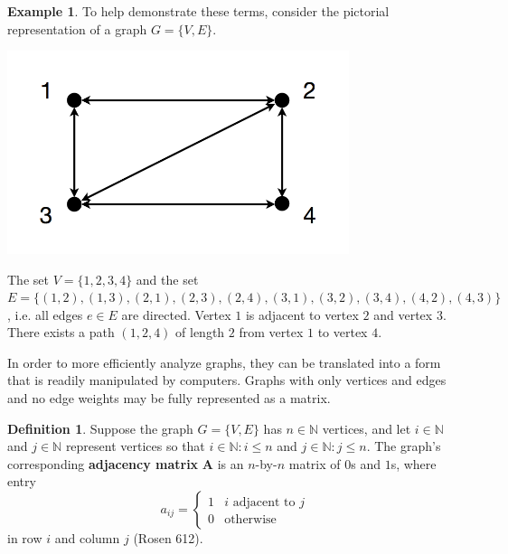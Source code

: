\documentclass[12pt]{amsart}
\theoremstyle{definition}
\newtheorem{definition}[thm]{Definition}
\newtheorem{example}[thm]{Example}
\theoremstyle{remark}
\numberwithin{equation}{section}
\newcommand{\N}{\mathbb{N}}
\begin{document}
\begin{example}
To help demonstrate these terms, consider the pictorial representation of a graph $G=\{V,E\}$.

\begin{center}\includegraphics[width=10cm]{figure-1-2.png}\end{center}

The set $V = \{1, 2, 3, 4\}$ and the set $E = \{(1, 2), (1, 3), (2, 1), (2, 3), (2, 4), (3, 1), (3, 2), (3, 4), \allowbreak(4, 2), (4, 3)\}$, i.e. all edges $e \in E$ are directed. Vertex $1$ is adjacent to vertex $2$ and vertex $3$. There exists a path $(1, 2, 4)$ of length $2$ from vertex $1$ to vertex $4$.
\end{example}

In order to more efficiently analyze graphs, they can be translated into a form that is readily manipulated by computers. Graphs with only vertices and edges and no edge weights may be fully represented as a matrix.

\begin{definition}
Suppose the graph $G = \{V,E\}$ has $n \in \N$ vertices, and let $i \in \N$ and $j \in \N$ represent vertices so that $ i \in \N : i \le n$ and $j \in \N : j \le n$. The graph's corresponding \textbf{adjacency matrix} $\mathbf{A}$ is an $n$-by-$n$ matrix of $0$s and $1$s, where entry
$$
	a_{ij} = \left\{
		\begin{array}{ll}
			1 & i \text{ adjacent to } j \\
			0             & \text{otherwise}
		\end{array}
	\right.
$$
in row $i$ and column $j$ (Rosen 612).
\end{definition}

\newpage
\end{document}
